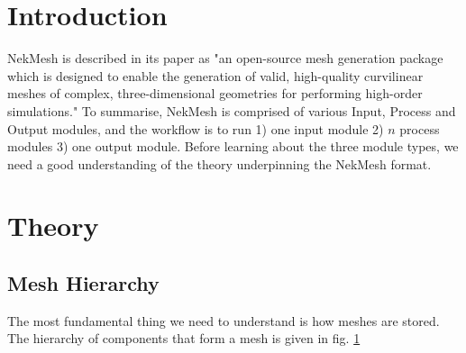 


%

\section{Introduction}
NekMesh is described in its paper \cite{NekMesh_paper} as "an
open-source mesh generation package which is designed to enable the
generation of valid, high-quality curvilinear meshes of complex,
three-dimensional geometries for performing high-order simulations."
To summarise, NekMesh is comprised of various Input, Process and
Output modules, and the workflow is to run 1) one input module 2) $n$
process modules 3) one output module. Before learning about the three
module types, we need a good understanding of the theory underpinning
the NekMesh format.

\section{Theory}
\subsection{Mesh Hierarchy}
The most fundamental thing we need to understand is how meshes are stored. The hierarchy of components that form a mesh is given in fig. \ref{fig:NekMesh_hierarchy}\\

\begin{figure}[h!]
  \centering
  
  \caption{}
  \label{fig:NekMesh_hierarchy}
\end{figure}

